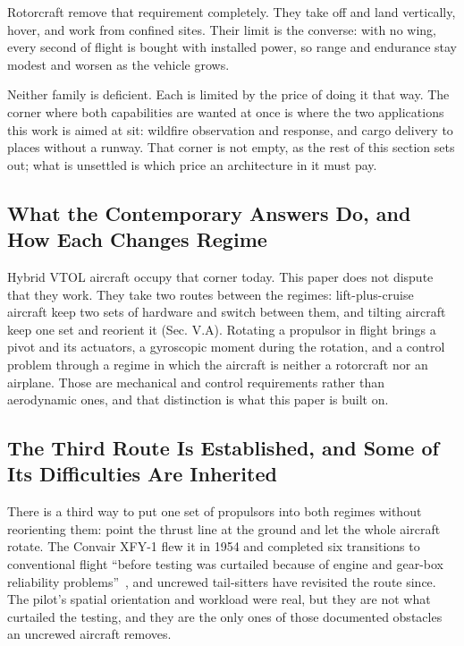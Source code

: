 \documentclass[journal]{new-aiaa}
\begin{document}
Rotorcraft remove that requirement completely. They take off and land vertically, hover, and work from confined sites. Their limit is the converse: with no wing, every second of flight is bought with installed power, so range and endurance stay modest and worsen as the vehicle grows.

Neither family is deficient. Each is limited by the price of doing it that way. The corner where both capabilities are wanted at once is where the two applications this work is aimed at sit: wildfire observation and response, and cargo delivery to places without a runway. That corner is not empty, as the rest of this section sets out; what is unsettled is which price an architecture in it must pay.

\subsection{What the Contemporary Answers Do, and How Each Changes Regime}

Hybrid VTOL aircraft occupy that corner today. This paper does not dispute that they work. They take two routes between the regimes: lift-plus-cruise aircraft keep two sets of hardware and switch between them, and tilting aircraft keep one set and reorient it (Sec. V.A). Rotating a propulsor in flight brings a pivot and its actuators, a gyroscopic moment during the rotation, and a control problem through a regime in which the aircraft is neither a rotorcraft nor an airplane. Those are mechanical and control requirements rather than aerodynamic ones, and that distinction is what this paper is built on.

\subsection{The Third Route Is Established, and Some of Its Difficulties Are Inherited}

There is a third way to put one set of propulsors into both regimes without reorienting them: point the thrust line at the ground and let the whole aircraft rotate. The Convair XFY-1 flew it in 1954 and completed six transitions to conventional flight ``before testing was curtailed because of engine and gear-box reliability problems''~\cite{r1}, and uncrewed tail-sitters have revisited the route since. The pilot's spatial orientation and workload were real, but they are not what curtailed the testing, and they are the only ones of those documented obstacles an uncrewed aircraft removes.
\end{document}
